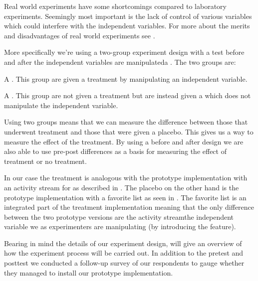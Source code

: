 Real world experiments have some shortcomings compared to laboratory
experiments. Seemingly most important is the lack of control of various
variables which could interfere with the independent variables.
For more about the merits and disadvantages of real world experiments
see \citet[]{robson93}.

More specifically we're using a two-group experiment design with a test before
and after the independent variables are manipulated\dash{}a .
The two groups are:

\begin{items}
  \item A . This group are given a treatment by
    manipulating an independent variable.
  \item A . This group are not given a treatment but are
    instead given a  which does not manipulate the independent
    variable.
\end{items}

Using two groups means that we can measure the difference between those that
underwent treatment and those that were given a placebo. This gives us a way
to measure the effect of the treatment.
By using a before and after design we are also able to use pre-post
differences as a basis for measuring the effect of treatment or no
treatment.

In our case the treatment is analogous with the prototype implementation with
an activity stream for \urort{} as described in
.
The placebo on the other hand is the 
prototype implementation with a favorite list as seen in
.
The favorite list is an integrated part of the treatment implementation
meaning that the only difference between the two prototype versions are
the activity stream\dash{}the independent variable we as experimenters are
manipulating (by introducing the feature).

Bearing in mind the details of our experiment design,
 will give an overview of how the experiment
process will be carried out. In addition to the pretest and posttest we
conducted a follow-up survey of our respondents to gauge whether they managed
to install our prototype implementation.

